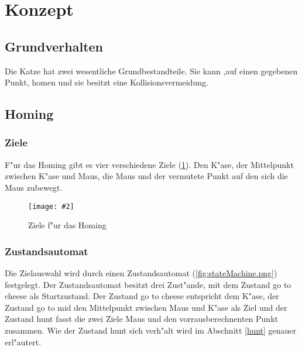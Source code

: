 \documentclass[
a4paper,     %
12pt         %
]{scrartcl}  %
\newcommand{\mygraphics}[3]{
\begin{figure}[!h]
  \begin{center}
    \texttt{[image: \#2]} \\
    \caption{#3}\label{fig:#2}
  \end{center}
\end{figure}

}
\begin{document}
\section{Konzept}
\subsection{Grundverhalten}
Die Katze hat zwei wesentliche Grundbestandteile. Sie kann ,auf einen gegebenen Punkt, \glqq homen\grqq{} und sie besitzt eine Kollisionsvermeidung.
\subsection{Homing}
\subsubsection{Ziele}
F"ur das Homing gibt es vier verschiedene Ziele (\ref{fig:homingZiele.png}). Den K"ase, der Mittelpunkt zwischen K"ase und Maus, die Maus und der vermutete Punkt auf den sich die Maus zubewegt.
\mygraphics{0.7\textwidth}{homingZiele.png}{Ziele f"ur das Homing}
\clearpage
\subsubsection{Zustandsautomat}
Die Zielauswahl wird durch einen Zustandsautomat (\ref{fig:stateMachine.png}) festgelegt.
Der Zustandsautomat besitzt drei Zust"ande, mit dem Zustand \glqq go to cheese\grqq{} als Startzustand. Der Zustand \glqq go to cheese\grqq{} entspricht dem K"ase, der Zustand \glqq go to mid\grqq{} den Mittelpunkt zwischen Maus und K"ase als Ziel und der Zustand \glqq hunt\grqq{} fasst die zwei Ziele Maus und den vorrausberechnenten Punkt zusammen. Wie der Zustand \glqq hunt\grqq{} sich verh"alt wird im Abschnitt \ref{hunt} genauer erl"autert.\\
\hspace*{0.63\textwidth}
\end{document}
